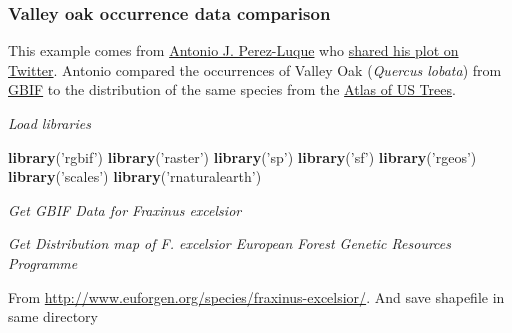 \documentclass[author-year, review, 11pt]{components/elsarticle} %
\newenvironment{Shaded}{\begin{snugshade}}{\end{snugshade}}
\newcommand{\KeywordTok}[1]{\textcolor[rgb]{0.13,0.29,0.53}{\textbf{#1}}}
\newcommand{\DataTypeTok}[1]{\textcolor[rgb]{0.13,0.29,0.53}{#1}}
\newcommand{\StringTok}[1]{\textcolor[rgb]{0.31,0.60,0.02}{#1}}
\newcommand{\OperatorTok}[1]{\textcolor[rgb]{0.81,0.36,0.00}{\textbf{#1}}}
\newcommand{\NormalTok}[1]{#1}
\begin{document}
\subsubsection{Valley oak occurrence data
comparison}\label{valley-oak-occurrence-data-comparison}

This example comes from \href{https://twitter.com/ajpelu}{Antonio J.
Perez-Luque} who
\href{https://twitter.com/ajpelu/status/473951167567757312}{shared his
plot on Twitter}. Antonio compared the occurrences of Valley Oak
(\emph{Quercus lobata}) from \href{http://www.gbif.org/}{GBIF} to the
distribution of the same species from the
\href{http://esp.cr.usgs.gov/data/little/}{Atlas of US Trees}.

\emph{Load libraries}

\begin{Shaded}
\begin{Highlighting}[]
\KeywordTok{library}\NormalTok{(}\StringTok{'rgbif'}\NormalTok{)}
\KeywordTok{library}\NormalTok{(}\StringTok{'raster'}\NormalTok{)}
\KeywordTok{library}\NormalTok{(}\StringTok{'sp'}\NormalTok{)}
\KeywordTok{library}\NormalTok{(}\StringTok{'sf'}\NormalTok{)}
\KeywordTok{library}\NormalTok{(}\StringTok{'rgeos'}\NormalTok{)}
\KeywordTok{library}\NormalTok{(}\StringTok{'scales'}\NormalTok{)}
\KeywordTok{library}\NormalTok{(}\StringTok{'rnaturalearth'}\NormalTok{)}
\end{Highlighting}
\end{Shaded}

\emph{Get GBIF Data for Fraxinus excelsior}

\begin{Shaded}
\end{Shaded}

\emph{Get Distribution map of F. excelsior European Forest Genetic
Resources Programme}

From \url{http://www.euforgen.org/species/fraxinus-excelsior/}. And save
shapefile in same directory
\end{document}
